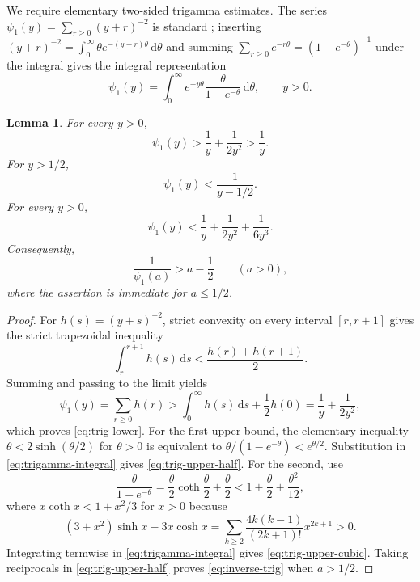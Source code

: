 \documentclass[11pt,a4paper]{amsart}
\numberwithin{equation}{section}
\theoremstyle{plain}
\newtheorem{lemma}[theorem]{Lemma}
\theoremstyle{definition}
\newcommand{\dd}{\,\mathrm d}
\begin{document}
We require elementary two-sided trigamma estimates.  The series
\(\psi_1(y)=\sum_{r\ge0}(y+r)^{-2}\) is standard
\cite[eq.~5.15.1]{NISTDLMFGamma}; inserting
\((y+r)^{-2}=\int_0^\infty\theta e^{-(y+r)\theta}\dd\theta\) and summing
\(\sum_{r\ge0}e^{-r\theta}=(1-e^{-\theta})^{-1}\) under the integral gives the
integral representation
\begin{equation}\label{eq:trigamma-integral}
 \psi_1(y)=\int_0^\infty e^{-y\theta}\frac{\theta}{1-e^{-\theta}}\dd\theta,
 \qquad y>0.
\end{equation}

\begin{lemma}\label{lem:trigamma-bounds}
For every \(y>0\),
\begin{equation}\label{eq:trig-lower}
 \psi_1(y)>\frac1y+\frac1{2y^2}>\frac1y.
\end{equation}
For \(y>1/2\),
\begin{equation}\label{eq:trig-upper-half}
 \psi_1(y)<\frac1{y-1/2}.
\end{equation}
For every \(y>0\),
\begin{equation}\label{eq:trig-upper-cubic}
 \psi_1(y)<\frac1y+\frac1{2y^2}+\frac1{6y^3}.
\end{equation}
Consequently,
\begin{equation}\label{eq:inverse-trig}
 \frac1{\psi_1(a)}>a-\frac12
 \qquad(a>0),
\end{equation}
where the assertion is immediate for \(a\le1/2\).
\end{lemma}

\begin{proof}
For \(h(s)=(y+s)^{-2}\), strict convexity on every interval \([r,r+1]\)
gives the strict trapezoidal inequality
\[
 \int_r^{r+1}h(s)\dd s<\frac{h(r)+h(r+1)}2.
\]
Summing and passing to the limit yields
\[
 \psi_1(y)=\sum_{r\ge0}h(r)>
 \int_0^\infty h(s)\dd s+\frac12h(0)
 =\frac1y+\frac1{2y^2},
\]
which proves \eqref{eq:trig-lower}.  For the first upper bound, the elementary inequality
\(\theta<2\sinh(\theta/2)\) for \(\theta>0\) is equivalent to
\(\theta/(1-e^{-\theta})<e^{\theta/2}\).  Substitution in
\eqref{eq:trigamma-integral} gives \eqref{eq:trig-upper-half}.
For the second, use
\[
 \frac{\theta}{1-e^{-\theta}}
 =\frac\theta2\coth\frac\theta2+\frac\theta2
 <1+\frac\theta2+\frac{\theta^2}{12},
\]
where \(x\coth x<1+x^2/3\) for \(x>0\) because
\[
 (3+x^2)\sinh x-3x\cosh x
 =\sum_{k\ge2}\frac{4k(k-1)}{(2k+1)!}x^{2k+1}>0.
\]
Integrating termwise in
\eqref{eq:trigamma-integral} gives \eqref{eq:trig-upper-cubic}.  Taking
reciprocals in \eqref{eq:trig-upper-half} proves \eqref{eq:inverse-trig} when
\(a>1/2\).
\end{proof}
\end{document}
